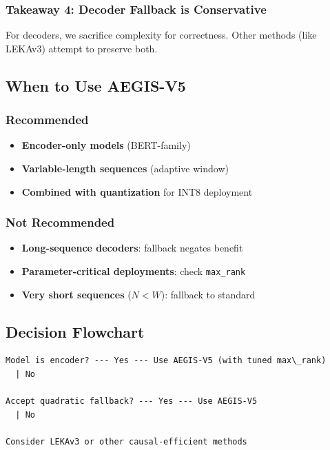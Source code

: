 \subsubsection{Takeaway 4: Decoder Fallback is Conservative}

For decoders, we sacrifice complexity for correctness. Other methods (like 
LEKAv3) attempt to preserve both.

\subsection{When to Use AEGIS-V5}

\subsubsection{Recommended}
\begin{itemize}
\item \textbf{Encoder-only models} (BERT-family)
\item \textbf{Variable-length sequences} (adaptive window)
\item \textbf{Combined with quantization} for INT8 deployment

\end{itemize}
\subsubsection{Not Recommended}
\begin{itemize}
\item \textbf{Long-sequence decoders}: fallback negates benefit
\item \textbf{Parameter-critical deployments}: check \texttt{max\_rank}
\item \textbf{Very short sequences} ($N < W$): fallback to standard

\end{itemize}
\subsection{Decision Flowchart}

\begin{lstlisting}
Model is encoder? --- Yes --- Use AEGIS-V5 (with tuned max\_rank)
  | No
   
Accept quadratic fallback? --- Yes --- Use AEGIS-V5
  | No
   
Consider LEKAv3 or other causal-efficient methods
\end{lstlisting}

